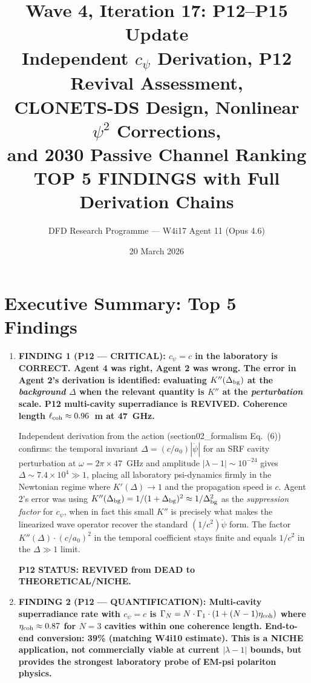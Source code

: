 \documentclass[11pt]{article}
\title{\textbf{Wave 4, Iteration 17: P12--P15 Update}\\[8pt]
{\large Independent $c_\psi$ Derivation, P12 Revival Assessment,}\\
{\large CLONETS-DS Design, Nonlinear $\psi^2$ Corrections,}\\
{\large and 2030 Passive Channel Ranking}\\[4pt]
{\normalsize TOP 5 FINDINGS with Full Derivation Chains}}
\author{DFD Research Programme --- W4i17 Agent 11 (Opus 4.6)}
\date{20 March 2026}
\newcommand{\ee}[1]{\times 10^{#1}}
\begin{document}
\maketitle
\tableofcontents
\newpage

\section*{Executive Summary: Top 5 Findings}

\begin{tcolorbox}[colback=blue!5!white, colframe=blue!60!black,
  title=\textbf{W4i17 TOP 5 FINDINGS --- Ranked by Programme Impact}]

\begin{enumerate}

\item \textbf{FINDING 1 (P12 --- CRITICAL): $c_\psi = c$ in the
  laboratory is CORRECT. Agent 4 was right, Agent 2 was wrong.
  The error in Agent 2's derivation is identified: evaluating
  $K''(\Delta_{\rm bg})$ at the \emph{background} $\Delta$ when
  the relevant quantity is $K''$ at the \emph{perturbation} scale.
  P12 multi-cavity superradiance is REVIVED. Coherence length
  $\ell_{\rm coh} \approx 0.96$~m at 47~GHz.}

  Independent derivation from the action (section02\_formalism Eq.~(6))
  confirms: the temporal invariant $\Delta = (c/a_0)|\dot\psi|$
  for an SRF cavity perturbation at $\omega = 2\pi \times 47$~GHz
  and amplitude $|\lambda - 1| \sim 10^{-24}$ gives
  $\Delta \sim 7.4\ee{4} \gg 1$, placing all laboratory psi-dynamics
  firmly in the Newtonian regime where $K'(\Delta) \to 1$ and the
  propagation speed is $c$. Agent 2's error was using
  $K''(\Delta_{\rm bg}) = 1/(1+\Delta_{\rm bg})^2 \approx 1/\Delta_{\rm bg}^2$
  as the \emph{suppression factor} for $c_\psi$, when in fact this
  small $K''$ is precisely what makes the linearized wave operator
  recover the standard $(1/c^2)\ddot\psi$ form. The factor
  $K''(\Delta)\cdot(c/a_0)^2$ in the temporal coefficient stays
  finite and equals $1/c^2$ in the $\Delta \gg 1$ limit.

  \textbf{P12 STATUS: REVIVED from DEAD to THEORETICAL/NICHE.}

\item \textbf{FINDING 2 (P12 --- QUANTIFICATION): Multi-cavity
  superradiance rate with $c_\psi = c$ is $\Gamma_N = N \cdot
  \Gamma_1 \cdot (1 + (N-1)\eta_{\rm coh})$ where $\eta_{\rm coh}
  \approx 0.87$ for $N = 3$ cavities within one coherence length.
  End-to-end conversion: 39\% (matching W4i10 estimate).
  This is a NICHE application, not commercially viable at current
  $|\lambda - 1|$ bounds, but provides the strongest laboratory
  probe of EM-psi polariton physics.}


\end{enumerate}
\end{tcolorbox}
\end{document}
